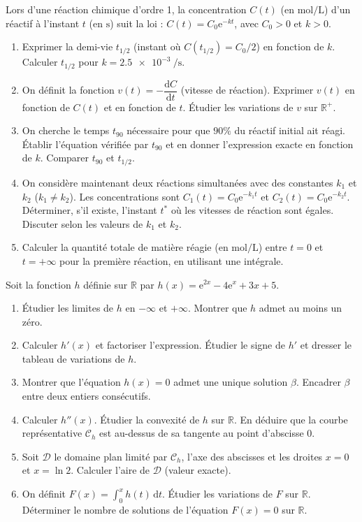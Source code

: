 \documentclass[11pt]{article}
\begin{document}
\begin{exercice}
Lors d'une réaction chimique d'ordre 1, la concentration $C(t)$ (en $\si{\mole\per\liter}$) d'un réactif à l'instant $t$ (en $\si{\second}$) suit la loi : $C(t) = C_0 \mathrm{e}^{-kt}$, avec $C_0 > 0$ et $k > 0$.
\begin{enumerate}
    \item Exprimer la demi-vie $t_{1/2}$ (instant où $C(t_{1/2}) = C_0/2$) en fonction de $k$. Calculer $t_{1/2}$ pour $k = \SI{2.5e-3}{\per\second}$.
    \item On définit la fonction $v(t) = -\dfrac{\mathrm{d} C}{\mathrm{d} t}$ (vitesse de réaction). Exprimer $v(t)$ en fonction de $C(t)$ et en fonction de $t$. Étudier les variations de $v$ sur $\mathbb{R}^+$.
    \item On cherche le temps $t_{90}$ nécessaire pour que $90\%$ du réactif initial ait réagi. Établir l'équation vérifiée par $t_{90}$ et en donner l'expression exacte en fonction de $k$. Comparer $t_{90}$ et $t_{1/2}$.
    \item On considère maintenant deux réactions simultanées avec des constantes $k_1$ et $k_2$ ($k_1 \neq k_2$). Les concentrations sont $C_1(t)=C_0\mathrm{e}^{-k_1 t}$ et $C_2(t)=C_0\mathrm{e}^{-k_2 t}$. Déterminer, s'il existe, l'instant $t^*$ où les vitesses de réaction sont égales. Discuter selon les valeurs de $k_1$ et $k_2$.
    \item Calculer la quantité totale de matière réagie (en $\si{\mole\per\liter}$) entre $t=0$ et $t=+\infty$ pour la première réaction, en utilisant une intégrale.
\end{enumerate}
\end{exercice}

\begin{exercice}
Soit la fonction $h$ définie sur $\mathbb{R}$ par $h(x) = \mathrm{e}^{2x} - 4\mathrm{e}^x + 3x + 5$.
\begin{enumerate}
    \item Étudier les limites de $h$ en $-\infty$ et $+\infty$. Montrer que $h$ admet au moins un zéro.
    \item Calculer $h'(x)$ et factoriser l'expression. Étudier le signe de $h'$ et dresser le tableau de variations de $h$.
    \item Montrer que l'équation $h(x)=0$ admet une unique solution $\beta$. Encadrer $\beta$ entre deux entiers consécutifs.
    \item Calculer $h''(x)$. Étudier la convexité de $h$ sur $\mathbb{R}$. En déduire que la courbe représentative $\mathcal{C}_h$ est au-dessus de sa tangente au point d'abscisse $0$.
    \item Soit $\mathcal{D}$ le domaine plan limité par $\mathcal{C}_h$, l'axe des abscisses et les droites $x=0$ et $x=\ln 2$. Calculer l'aire de $\mathcal{D}$ (valeur exacte).
    \item On définit $F(x) = \int_0^x h(t)\,\mathrm{d}t$. Étudier les variations de $F$ sur $\mathbb{R}$. Déterminer le nombre de solutions de l'équation $F(x)=0$ sur $\mathbb{R}$.
\end{enumerate}
\end{exercice}
\end{document}

